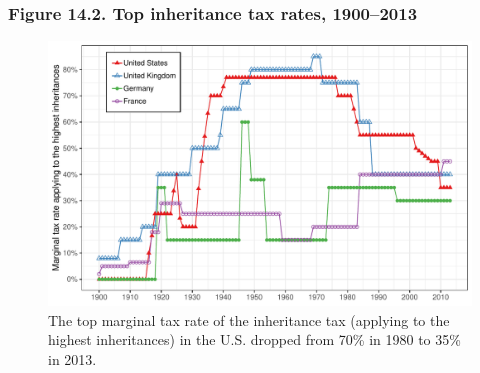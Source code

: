 \documentclass[t]{beamer}\usepackage[]{graphicx}\usepackage[]{color}
\newenvironment{knitrout}{}{} %
\begin{document}
\begin{frame}[label=Figure_14_2]
\frametitle{Figure 14.2. Top inheritance tax rates, 1900--2013}
\begin{figure}[t]
\begin{minipage}[b]{\textwidth}
\centering
\begin{knitrout}\footnotesize
{}\color{fgcolor}

{\centering \includegraphics[width=1\linewidth]{figures/color/Figure_14_2} 

}



\end{knitrout}
\caption{The top marginal tax rate of the inheritance tax (applying to the highest inheritances) in the U.S. dropped from 70\% in 1980 to 35\% in 2013.}
\end{minipage}
\end{figure}
\end{frame}









\end{document}
